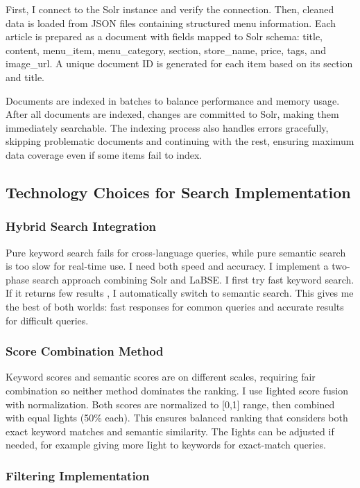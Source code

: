 \documentclass[11pt,a4paper]{article}
\begin{document}
First, I connect to the Solr instance and verify the connection. Then, cleaned data is loaded from JSON files containing structured menu information. Each article is prepared as a document with fields mapped to Solr schema: title, content, menu\_item, menu\_category, section, store\_name, price, tags, and image\_url. A unique document ID is generated for each item based on its section and title.

Documents are indexed in batches to balance performance and memory usage. After all documents are indexed, changes are committed to Solr, making them immediately searchable. The indexing process also handles errors gracefully, skipping problematic documents and continuing with the rest, ensuring maximum data coverage even if some items fail to index.

\subsection{Technology Choices for Search Implementation}

\subsubsection{Hybrid Search Integration}

Pure keyword search fails for cross-language queries, while pure semantic search is too slow for real-time use. I need both speed and accuracy. I implement a two-phase search approach combining Solr and LaBSE. I first try fast keyword search. If it returns few results , I automatically switch to semantic search. This gives me the best of both worlds: fast responses for common queries and accurate results for difficult queries.

\subsubsection{Score Combination Method}

Keyword scores and semantic scores are on different scales, requiring fair combination so neither method dominates the ranking. I use Iighted score fusion with normalization. Both scores are normalized to [0,1] range, then combined with equal Iights (50\% each). This ensures balanced ranking that considers both exact keyword matches and semantic similarity. The Iights can be adjusted if needed, for example giving more Iight to keywords for exact-match queries.

\subsubsection{Filtering Implementation}
\end{document}
